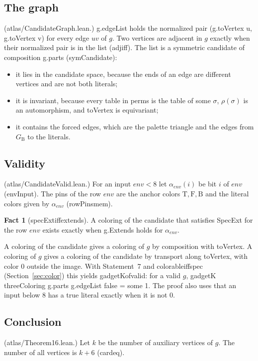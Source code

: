 \documentclass[11pt,a4paper]{article}
\newcommand{\leanus}{\textunderscore\allowbreak}
\newcommand{\lean}[1]{{\ttfamily\let\_\leanus #1}}
\newcommand{\GB}{G_{\mathrm{B}}}
\newcommand{\T}{\mathrm{T}}
\newcommand{\F}{\mathrm{F}}
\newcommand{\B}{\mathrm{B}}
\theoremstyle{definition}
\newtheorem{fact}{Fact}
\begin{document}
\subsection{The graph}
(\lean{atlas/CandidateGraph.lean}.) \lean{g.edgeList} holds the normalized
pair \lean{(g.toVertex u, g.toVertex v)} for every edge $uv$ of $g$. Two
vertices are adjacent in $g$ exactly when their normalized pair is in the
list (\lean{adj\_iff}). The list is a symmetric candidate of composition
\lean{g.parts} (\lean{symCandidate}):
\begin{itemize}
\item it lies in the candidate space, because the ends of an edge are
different vertices and are not both literals;
\item it is invariant, because every table in \lean{perms} is the table of
some $\sigma$, $\rho(\sigma)$ is an automorphism, and \lean{toVertex} is
equivariant;
\item it contains the forced edges, which are the palette triangle and the
edges from $\GB$ to the literals.
\end{itemize}

\subsection{Validity}\label{sec:valid}
(\lean{atlas/CandidateValid.lean}.) For an input $\mathit{env}<8$ let
$\alpha_{\mathit{env}}(i)$ be bit $i$ of $\mathit{env}$ (\lean{envInput}).
The pins of the row $\mathit{env}$ are the anchor colors $\T,\F,\B$ and the
literal colors given by $\alpha_{\mathit{env}}$ (\lean{rowPins\_mem}).

\begin{fact}[\lean{specExt\_iff\_extends}]
A coloring of the candidate that satisfies \lean{SpecExt} for the row
$\mathit{env}$ exists exactly when \lean{g.Extends} holds for
$\alpha_{\mathit{env}}$.
\end{fact}

A coloring of the candidate gives a coloring of $g$ by composition with
\lean{toVertex}. A coloring of $g$ gives a coloring of the candidate by
transport along \lean{toVertex}, with color 0 outside the image. With
Statement~7 and \lean{colorable\_iff\_spec} (Section~\ref{sec:color}) this
yields \lean{gadgetK\_of\_valid}: for a valid $g$,
\lean{gadgetK threeColoring g.parts g.edgeList false = some 1}. The proof
also uses that an input below 8 has a true literal exactly when it is not 0.

\subsection{Conclusion}\label{sec:conclusion}
(\lean{atlas/Theorem16.lean}.) Let $k$ be the number of auxiliary vertices
of $g$. The number of all vertices is $k+6$ (\lean{card\_eq}).
\end{document}
